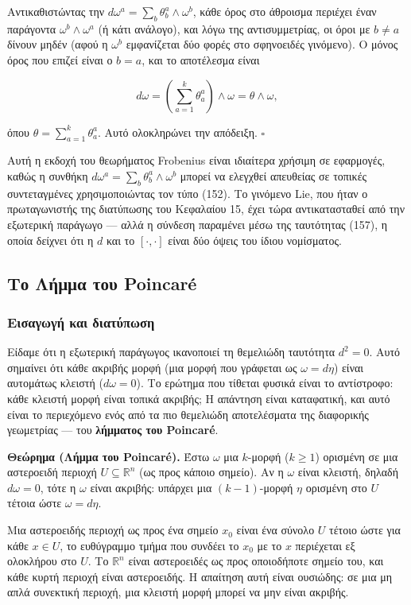 \documentclass[12pt]{article}
\begin{document}
Αντικαθιστώντας την $d\omega^a = \sum_b \theta^a_b \wedge \omega^b$, κάθε όρος στο άθροισμα περιέχει έναν παράγοντα $\omega^b \wedge \omega^a$ (ή κάτι ανάλογο), και λόγω της αντισυμμετρίας, οι όροι με $b \neq a$ δίνουν μηδέν (αφού η $\omega^b$ εμφανίζεται δύο φορές στο σφηνοειδές γινόμενο). Ο μόνος όρος που επιζεί είναι ο $b = a$, και το αποτέλεσμα είναι

\[
d\omega = \left( \sum_{a=1}^{k} \theta^a_a \right) \wedge \omega = \theta \wedge \omega,
\]

όπου $\theta = \sum_{a=1}^{k} \theta^a_a$. Αυτό ολοκληρώνει την απόδειξη. $\square$

Αυτή η εκδοχή του θεωρήματος Frobenius είναι ιδιαίτερα χρήσιμη σε εφαρμογές, καθώς η συνθήκη $d\omega^a = \sum_b \theta^a_b \wedge \omega^b$ μπορεί να ελεγχθεί απευθείας σε τοπικές συντεταγμένες χρησιμοποιώντας τον τύπο (152). Το γινόμενο Lie, που ήταν ο πρωταγωνιστής της διατύπωσης του Κεφαλαίου 15, έχει τώρα αντικατασταθεί από την εξωτερική παράγωγο — αλλά η σύνδεση παραμένει μέσω της ταυτότητας (157), η οποία δείχνει ότι η $d$ και το $[\cdot, \cdot]$ είναι δύο όψεις του ίδιου νομίσματος.

\subsection{Το Λήμμα του Poincaré}

\subsubsection{Εισαγωγή και διατύπωση}

Είδαμε ότι η εξωτερική παράγωγος ικανοποιεί τη θεμελιώδη ταυτότητα $d^2 = 0$. Αυτό σημαίνει ότι κάθε ακριβής μορφή (μια μορφή που γράφεται ως $\omega = d\eta$) είναι αυτομάτως κλειστή ($d\omega = 0$). Το ερώτημα που τίθεται φυσικά είναι το αντίστροφο: κάθε κλειστή μορφή είναι τοπικά ακριβής; Η απάντηση είναι καταφατική, και αυτό είναι το περιεχόμενο ενός από τα πιο θεμελιώδη αποτελέσματα της διαφορικής γεωμετρίας — του \textbf{λήμματος του Poincaré}.

\textbf{Θεώρημα (Λήμμα του Poincaré).} Έστω $\omega$ μια $k$-μορφή ($k \ge 1$) ορισμένη σε μια αστεροειδή περιοχή $U \subseteq \mathbb{R}^n$ (ως προς κάποιο σημείο). Αν η $\omega$ είναι κλειστή, δηλαδή $d\omega = 0$, τότε η $\omega$ είναι ακριβής: υπάρχει μια $(k-1)$-μορφή $\eta$ ορισμένη στο $U$ τέτοια ώστε $\omega = d\eta$.

Μια αστεροειδής περιοχή ως προς ένα σημείο $x_0$ είναι ένα σύνολο $U$ τέτοιο ώστε για κάθε $x \in U$, το ευθύγραμμο τμήμα που συνδέει το $x_0$ με το $x$ περιέχεται εξ ολοκλήρου στο $U$. Το $\mathbb{R}^n$ είναι αστεροειδές ως προς οποιοδήποτε σημείο του, και κάθε κυρτή περιοχή είναι αστεροειδής. Η απαίτηση αυτή είναι ουσιώδης: σε μια μη απλά συνεκτική περιοχή, μια κλειστή μορφή μπορεί να μην είναι ακριβής.
\end{document}
